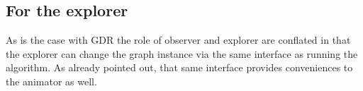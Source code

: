 \subsection{For the explorer}
\label{sec:explorer}

As is the case with GDR the role of observer and explorer are conflated in that
the explorer can change the graph instance via the same interface as running the
algorithm. As already pointed out, that same interface provides conveniences
to the animator as well.


